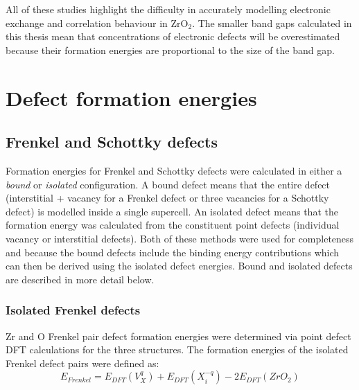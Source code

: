 All of these studies highlight the difficulty in accurately modelling electronic exchange and correlation behaviour in ZrO$_{2}$. The smaller band gaps calculated in this thesis mean that concentrations of electronic defects will be overestimated because their formation energies are proportional to the size of the band gap. 

\section{Defect formation energies}

\subsection{Frenkel and Schottky defects}

Formation energies for Frenkel and Schottky defects were calculated in either a \emph{bound} or \emph{isolated} configuration. A bound defect means that the entire defect (interstitial + vacancy for a Frenkel defect or three vacancies for a Schottky defect) is modelled inside a single supercell. An isolated defect means that the formation energy was calculated from the constituent point defects (individual vacancy or interstitial defects). Both of these methods were used for completeness and because the bound defects include the binding energy contributions which can then be derived using the isolated defect energies. Bound and isolated defects are described in more detail below.

\subsubsection{Isolated Frenkel defects}

Zr and O Frenkel pair defect formation energies were determined via point defect DFT calculations for the three structures. The formation energies of the isolated Frenkel defect pairs were defined as: %
\begin{equation}
\label{equation_frenkel}
E_{Frenkel} = E_{DFT}(V^{q}_{X}) + E_{DFT}(X^{-q}_{i}) - 2E_{DFT}(ZrO_2)%
\end{equation}

